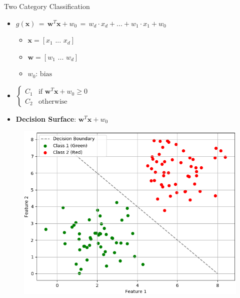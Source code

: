 \documentclass[serif, aspectratio=169]{beamer}
\begin{document}
\begin{frame}{Two Category Classification}
    \begin{itemize}\itemsep1.5em
        \item \(g(\mathbf{x}) \, = \, \mathbf{w}^T\mathbf{x} + w_0 \, = \, w_d \cdot x_d + ... + w_1 \cdot x_1 + w_0\)
        \begin{itemize}
            \item \(\mathbf{x} = [x_1 \, \, ... \, \, x_d]\)
            \item \(\mathbf{w} = [w_1 \, \, ... \, \, w_d]\)
            \item \(w_0 \text{: bias}\)
        \end{itemize}
        \item \(
            \begin{cases} 
                C_1 & \text{if } \mathbf{w}^T\mathbf{x} + w_0 \geq 0 \\
                C_2 & \text{otherwise}
            \end{cases}
            \)
        \item \justifying \textbf{Decision Surface}: \(\mathbf{w}^T\mathbf{x} + w_0\)
    \end{itemize}
    \endminipage
    \hfill
        \begin{figure}[bh]
            \includegraphics[width=\linewidth]{pic/Figure_1.png}
        \end{figure}
    \endminipage
\end{frame}
\end{document}
